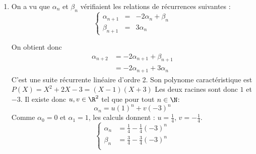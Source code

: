 \begin{correction}
\begin{enumerate}
\item On a vu que $\alpha_n$ et $\beta_n$ vérifiaient les relations de récurrences suivantes : 
$$\left\{ \begin{array}{rcl}
\alpha_{n+1} &=& -2\alpha_n +\beta_n\\
\beta_{n+1} &=& 3\alpha_n
\end{array}\right.$$

On obtient donc 
\begin{align*}
\alpha_{n+2} &= -2\alpha_{n+1} + \beta_{n+1}  \\
					&= -2\alpha_{n+1} +3\alpha_n
\end{align*}
C'est une suite récurrente linéaire d'ordre 2. Son polynome caractéristique est $P(X)=X^2 +2X -3=(X-1)(X+3)$ Les deux racines sont donc $1 $ et $-3$. Il existe donc $u,v\in \R^2$ tel que pour tout $n\in \N$:
$$\alpha_n = u (1)^n +v (-3)^n$$
Comme $\alpha_0 =0 $ et $\alpha_1 =1 $, les calculs donnent : 
$u = \frac{1}{4}$, $v=-\frac{1}{4}$. 
$$\left\{ 
\begin{array}{cc}
\alpha_n &= \frac{1}{4}  - \frac{1}{4} (-3)^n \\
\beta_n &= \frac{3}{4}  - \frac{3}{4} (-3)^n \\
\end{array}\right.
$$





\end{enumerate}
\end{correction}